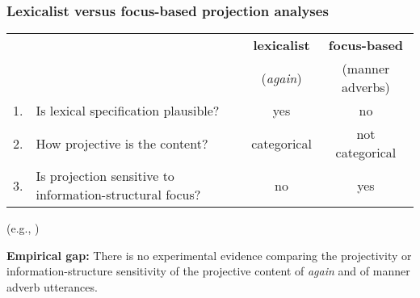 \documentclass[pdf,xcolor=table,envcountsect,handout]{beamer}
\begin{document}
\begin{frame}
\frametitle{Lexicalist versus focus-based projection analyses}

\hspace*{-.5cm} \begin{tabular}{lp{5.1cm} | cc}

& & {\bf lexicalist} & {\bf focus-based} \\

& & ({\em again}) & (manner adverbs) \\ \hline

1.  & Is lexical specification plausible? & yes & no  \\[.2cm]

\pause

2. & How projective is the content? & categorical & not categorical  \\[.2cm]

\pause

3. & Is projection sensitive to information-structural focus? & no & yes  \\


\end{tabular}
\vspace*{-.2cm} \hfill \begin{tiny} (e.g., \citealt{beck2006,abrusan2013,abrusan2013b,stevens-etal2017}) \end{tiny}

\vspace*{1cm}
\pause

{\bf Empirical gap:} There is no experimental evidence comparing the projectivity or information-structure sensitivity of the projective content of {\em again} and of manner adverb utterances.


\end{frame}
\end{document}
